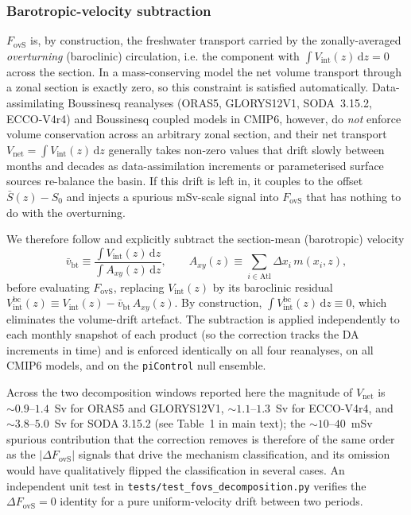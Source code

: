 \documentclass[11pt,a4paper]{article}
\newcommand{\Fovs}{F_\mathrm{ovS}}
\begin{document}
\subsubsection*{Barotropic-velocity subtraction}

$\Fovs$ is, by construction, the freshwater transport carried by the zonally-averaged \emph{overturning} (baroclinic) circulation, i.e. the component with $\int V_\mathrm{int}(z)\,\mathrm{d}z = 0$ across the section. In a mass-conserving model the net volume transport through a zonal section is exactly zero, so this constraint is satisfied automatically. Data-assimilating Boussinesq reanalyses (ORAS5, GLORYS12V1, SODA~3.15.2, ECCO-V4r4) and Boussinesq coupled models in CMIP6, however, do \emph{not} enforce volume conservation across an arbitrary zonal section, and their net transport $V_\mathrm{net} = \int V_\mathrm{int}(z)\,\mathrm{d}z$ generally takes non-zero values that drift slowly between months and decades as data-assimilation increments or parameterised surface sources re-balance the basin. If this drift is left in, it couples to the offset $\bar{S}(z) - S_0$ and injects a spurious mSv-scale signal into $\Fovs$ that has nothing to do with the overturning.

We therefore follow \citet{deVriesWeber2005, Mecking2017, Weijer2019} and explicitly subtract the section-mean (barotropic) velocity
\begin{equation}
\bar{v}_\mathrm{bt} \equiv
   \frac{\int V_\mathrm{int}(z)\,\mathrm{d}z}
        {\int A_{xy}(z)\,\mathrm{d}z},
  \qquad
A_{xy}(z) \equiv \sum_{i\in\mathrm{Atl}} \Delta x_i\,m(x_i, z),
\end{equation}
before evaluating $\Fovs$, replacing $V_\mathrm{int}(z)$ by its baroclinic residual $V_\mathrm{int}^{\mathrm{bc}}(z) \equiv V_\mathrm{int}(z) - \bar{v}_\mathrm{bt}\,A_{xy}(z)$. By construction, $\int V_\mathrm{int}^{\mathrm{bc}}(z)\,\mathrm{d}z \equiv 0$, which eliminates the volume-drift artefact. The subtraction is applied independently to each monthly snapshot of each product (so the correction tracks the DA increments in time) and is enforced identically on all four reanalyses, on all CMIP6 models, and on the \texttt{piControl} null ensemble.

Across the two decomposition windows reported here the magnitude of $V_\mathrm{net}$ is $\sim0.9$--$1.4$~Sv for ORAS5 and GLORYS12V1, $\sim1.1$--$1.3$~Sv for ECCO-V4r4, and $\sim3.8$--$5.0$~Sv for SODA 3.15.2 (see Table~1 in main text); the $\sim10$--$40$~mSv spurious contribution that the correction removes is therefore of the same order as the $|\Delta\Fovs|$ signals that drive the mechanism classification, and its omission would have qualitatively flipped the classification in several cases. An independent unit test in \texttt{tests/test\_fovs\_decomposition.py} verifies the $\Delta\Fovs = 0$ identity for a pure uniform-velocity drift between two periods.
\end{document}
